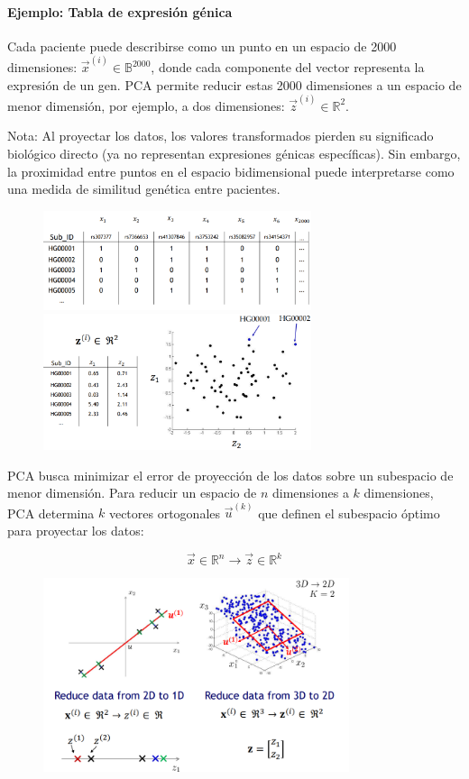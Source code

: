 \paragraph{Ejemplo: Tabla de expresión génica}
Cada paciente puede describirse como un punto en un espacio de 2000 dimensiones: $\vec{x}^{(i)} \in \mathbb{B}^{2000}$,  donde cada componente del vector representa la expresión de un gen.
PCA permite reducir estas 2000 dimensiones a un espacio de menor dimensión, por ejemplo, a dos dimensiones: $\vec{z}^{(i)} \in \mathbb{R}^2$.

Nota: Al proyectar los datos, los valores transformados pierden su significado biológico directo (ya no representan expresiones génicas específicas). Sin embargo, la proximidad entre puntos en el espacio bidimensional puede interpretarse como una medida de similitud genética entre pacientes.

\begin{figure}[h]
\centering
\includegraphics[width = 0.7\textwidth]{figs/gene-table1.png}
\includegraphics[width = 0.7\textwidth]{figs/gene-table2.png}
\end{figure}

PCA busca minimizar el error de proyección de los datos sobre un subespacio de menor dimensión. Para reducir un espacio de $n$ dimensiones a $k$ dimensiones, PCA determina $k$ vectores ortogonales $\vec{u}^{(k)}$ que definen el subespacio óptimo para proyectar los datos:

$$\vec{x} \in \mathbb{R}^n \rightarrow \vec{z} \in \mathbb{R}^k$$

\begin{figure}[h]
\centering
\includegraphics[width = 0.8\textwidth]{figs/pca-dimensiones.png}
\end{figure}

